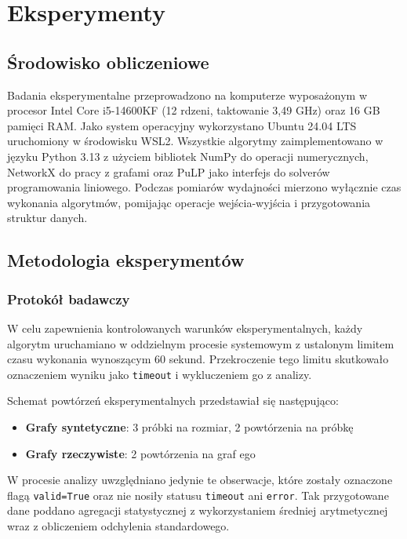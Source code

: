 \chapter{Eksperymenty}

\section{Środowisko obliczeniowe}

Badania eksperymentalne przeprowadzono na komputerze wyposażonym w procesor Intel Core i5-14600KF (12 rdzeni, taktowanie 3,49 GHz) oraz 16 GB pamięci RAM. Jako system operacyjny wykorzystano Ubuntu 24.04 LTS uruchomiony w środowisku WSL2. Wszystkie algorytmy zaimplementowano w języku Python 3.13 z użyciem bibliotek NumPy do operacji numerycznych, NetworkX do pracy z grafami oraz PuLP jako interfejs do solverów programowania liniowego. Podczas pomiarów wydajności mierzono wyłącznie czas wykonania algorytmów, pomijając operacje wejścia-wyjścia i przygotowania struktur danych.

\section{Metodologia eksperymentów}

\subsection{Protokół badawczy}

W celu zapewnienia kontrolowanych warunków eksperymentalnych, każdy algorytm uruchamiano w oddzielnym procesie systemowym z ustalonym limitem czasu wykonania wynoszącym 60 sekund. Przekroczenie tego limitu skutkowało oznaczeniem wyniku jako \texttt{timeout} i wykluczeniem go z analizy.

Schemat powtórzeń eksperymentalnych przedstawiał się następująco:

\begin{itemize}
\item \textbf{Grafy syntetyczne}: 3 próbki na rozmiar, 2 powtórzenia na próbkę
\item \textbf{Grafy rzeczywiste}: 2 powtórzenia na graf ego
\end{itemize}

W procesie analizy uwzględniano jedynie te obserwacje, które zostały oznaczone flagą \texttt{valid=True} oraz nie nosiły statusu \texttt{timeout} ani \texttt{error}. Tak przygotowane dane poddano agregacji statystycznej z wykorzystaniem średniej arytmetycznej wraz z obliczeniem odchylenia standardowego.

